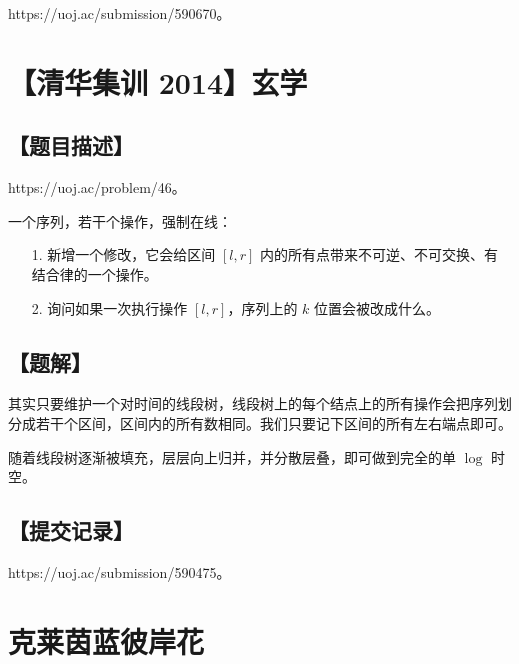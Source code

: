\documentclass[UTF8,12pt,a4paper]{ctexart}
\begin{document}
	https://uoj.ac/submission/590670。
	
	
	\section*{【清华集训 2014】玄学}
	
	\subsection*{【题目描述】}
	
	https://uoj.ac/problem/46。
	
	一个序列，若干个操作，强制在线：
	
	\begin{itemize}
		\item [1.] 新增一个修改，它会给区间 $[l,r]$ 内的所有点带来不可逆、不可交换、有结合律的一个操作。
		\item [2.] 询问如果一次执行操作 $[l,r]$，序列上的 $k$ 位置会被改成什么。
	\end{itemize}
	
	\subsection*{【题解】}
	
	其实只要维护一个对时间的线段树，线段树上的每个结点上的所有操作会把序列划分成若干个区间，区间内的所有数相同。我们只要记下区间的所有左右端点即可。
	
	随着线段树逐渐被填充，层层向上归并，并分散层叠，即可做到完全的单 $\log$ 时空。
	
	\subsection*{【提交记录】}
	
	https://uoj.ac/submission/590475。
	
	
	\section*{克莱茵蓝彼岸花}
	
\end{document}
